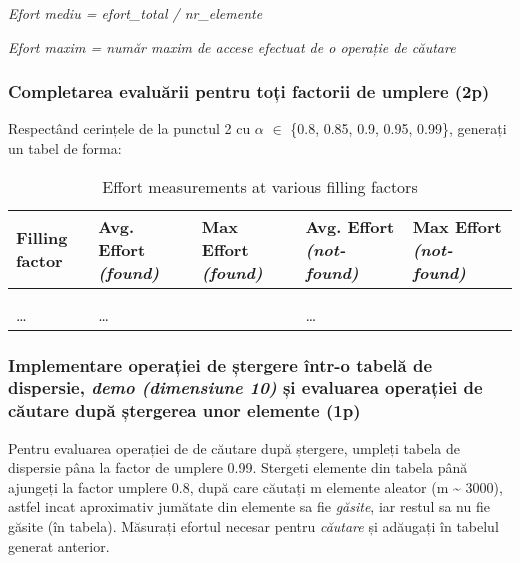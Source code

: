 \documentclass[../ro-fa-lab.tex]{subfiles}
\begin{document}
\emph{Efort mediu = efort\_total / nr\_elemente}

\emph{Efort maxim = număr maxim de accese efectuat de o operație de
căutare}

\subsubsection{Completarea evaluării pentru toți factorii de umplere
(2p)}\label{completarea-evaluux103rii-pentru-toux21bi-factorii-de-umplere-2p}

Respectând cerințele de la punctul 2 cu \emph{$\alpha$} $\in$ \{0.8, 0.85, 0.9,
0.95, 0.99\}, generați un tabel de forma:

\begin{table}[ht]
  \centering
  \caption{Effort measurements at various filling factors}
  \label{tbl:effort-vs-filling-extended}
  \begin{tabularx}{\textwidth}{%
      >{\centering\arraybackslash}X
      >{\centering\arraybackslash}X
      >{\centering\arraybackslash}X
      >{\centering\arraybackslash}X
      >{\centering\arraybackslash}X
    }
    \toprule
    \textbf{Filling factor}
      & \textbf{Avg. Effort \emph{(found)}}
      & \textbf{Max Effort \emph{(found)}}
      & \textbf{Avg. Effort \emph{(not-found)}}
      & \textbf{Max Effort \emph{(not-found)}} \\
    \midrule
    0.80  &     &     &     &     \\
    0.85  &     &     &     &     \\
    …     & …   &     & …   &     \\
    \bottomrule
  \end{tabularx}
\end{table}

\subsubsection{\texorpdfstring{Implementare operației de ștergere într-o
tabelă de dispersie, \emph{demo (dimensiune 10)} și evaluarea operației
de căutare după ștergerea unor elemente
(1p)}{Implementare operației de ștergere într-o tabelă de dispersie, demo (dimensiune 10) și evaluarea operației de căutare după ștergerea unor elemente (1p)}}\label{implementare-operaux21biei-de-ux219tergere-uxeentr-o-tabelux103-de-dispersie-demo-dimensiune-10-ux219i-evaluarea-operaux21biei-de-cux103utare-dupux103-ux219tergerea-unor-elemente-1p}

Pentru evaluarea operației de de căutare după ștergere, umpleți tabela
de dispersie pâna la factor de umplere 0.99. Stergeti elemente din
tabela până ajungeți la factor umplere 0.8, după care căutați m elemente
aleator (m \textasciitilde{} 3000), astfel incat aproximativ jumătate
din elemente sa fie \emph{găsite}, iar restul sa nu fie găsite (în
tabela). Măsurați efortul necesar pentru \emph{căutare} și adăugați în
tabelul generat anterior.
\end{document}
